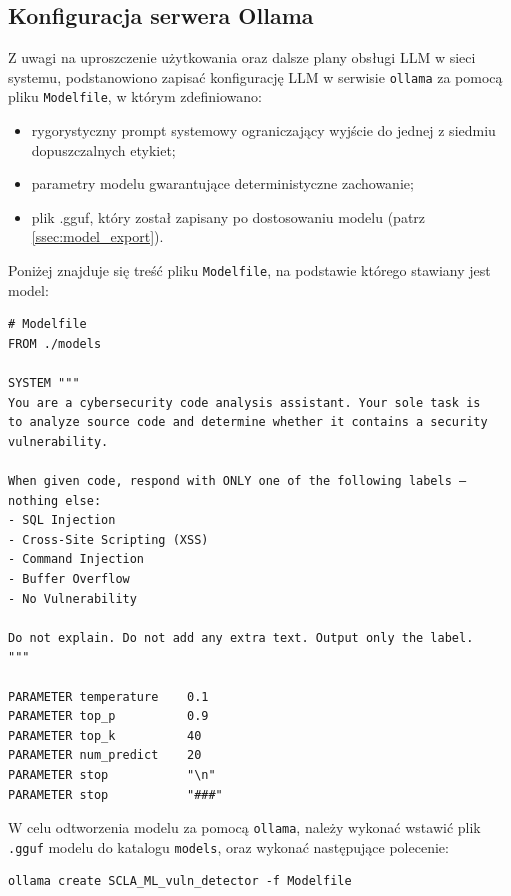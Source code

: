 \documentclass[12pt,a4paper]{article}
\begin{document}
\subsection{Konfiguracja serwera Ollama}

Z uwagi na uproszczenie użytkowania oraz dalsze plany obsługi LLM w sieci systemu, podstanowiono zapisać konfigurację LLM w serwisie \texttt{ollama} za pomocą
pliku \texttt{Modelfile}, w którym zdefiniowano:
\begin{itemize}
    \item rygorystyczny prompt systemowy ograniczający wyjście do jednej z siedmiu dopuszczalnych etykiet;
    \item parametry modelu gwarantujące deterministyczne zachowanie;
    \item plik .gguf, który został zapisany po dostosowaniu modelu (patrz \ref{ssec:model_export}).
\end{itemize} 

Poniżej znajduje się treść pliku \texttt{Modelfile}, na podstawie którego stawiany jest model:

\begin{tcolorbox}
\begin{verbatim}
# Modelfile
FROM ./models

SYSTEM """
You are a cybersecurity code analysis assistant. Your sole task is 
to analyze source code and determine whether it contains a security 
vulnerability.

When given code, respond with ONLY one of the following labels —
nothing else:
- SQL Injection
- Cross-Site Scripting (XSS)
- Command Injection
- Buffer Overflow
- No Vulnerability

Do not explain. Do not add any extra text. Output only the label.
"""

PARAMETER temperature    0.1
PARAMETER top_p          0.9
PARAMETER top_k          40
PARAMETER num_predict    20
PARAMETER stop           "\n"
PARAMETER stop           "###"
\end{verbatim}
\end{tcolorbox}

W celu odtworzenia modelu za pomocą \texttt{ollama}, należy wykonać wstawić plik \texttt{.gguf} modelu do katalogu \texttt{models}, oraz wykonać 
następujące polecenie:
\begin{tcolorbox}
\begin{verbatim}
ollama create SCLA_ML_vuln_detector -f Modelfile
\end{verbatim}    
\end{tcolorbox}
\end{document}
